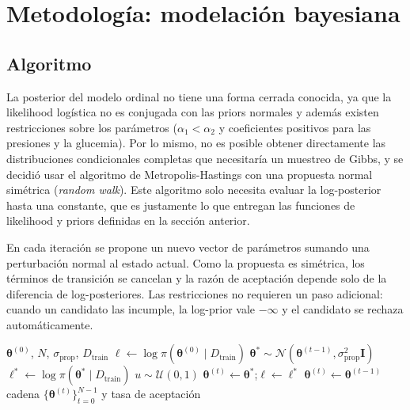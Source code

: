 % 
\section{Metodología: modelación bayesiana}
\subsection{Algoritmo}
La posterior del modelo ordinal no tiene una forma cerrada conocida, ya que la
likelihood logística no es conjugada con las priors normales y además existen
restricciones sobre los parámetros ($\alpha_1<\alpha_2$ y coeficientes positivos
para las presiones y la glucemia). Por lo mismo, no es posible obtener
directamente las distribuciones condicionales completas que necesitaría un
muestreo de Gibbs, y se decidió usar el algoritmo de Metropolis-Hastings con una
propuesta normal simétrica (\emph{random walk}). Este algoritmo solo necesita
evaluar la log-posterior hasta una constante, que es justamente lo que entregan
las funciones de likelihood y priors definidas en la sección anterior.

En cada iteración se propone un nuevo vector de parámetros sumando una
perturbación normal al estado actual. Como la propuesta es simétrica, los
términos de transición se cancelan y la razón de aceptación depende solo de la
diferencia de log-posteriores. Las restricciones no requieren un paso adicional:
cuando un candidato las incumple, la log-prior vale $-\infty$ y el candidato se
rechaza automáticamente.

\begin{algorithm}[h]
\caption{Metropolis-Hastings con propuesta normal simétrica}
\begin{algorithmic}[1]
\Require $\boldsymbol{\theta}^{(0)}$, $N$, $\sigma_{\mathrm{prop}}$, $D_{\mathrm{train}}$
\State $\ell \gets \log\pi(\boldsymbol{\theta}^{(0)}\mid D_{\mathrm{train}})$
  \State $\boldsymbol{\theta}^{*}\sim\mathcal{N}\!\left(\boldsymbol{\theta}^{(t-1)},\sigma_{\mathrm{prop}}^{2}\mathbf{I}\right)$
  \State $\ell^{*}\gets\log\pi(\boldsymbol{\theta}^{*}\mid D_{\mathrm{train}})$
  \State $u\sim\mathcal{U}(0,1)$
    \State $\boldsymbol{\theta}^{(t)}\gets\boldsymbol{\theta}^{*}$;\quad $\ell\gets\ell^{*}$
  \Else
    \State $\boldsymbol{\theta}^{(t)}\gets\boldsymbol{\theta}^{(t-1)}$
  \EndIf
\EndFor
\State \Return cadena $\{\boldsymbol{\theta}^{(t)}\}_{t=0}^{N-1}$ y tasa de aceptación
\end{algorithmic}
\end{algorithm}

